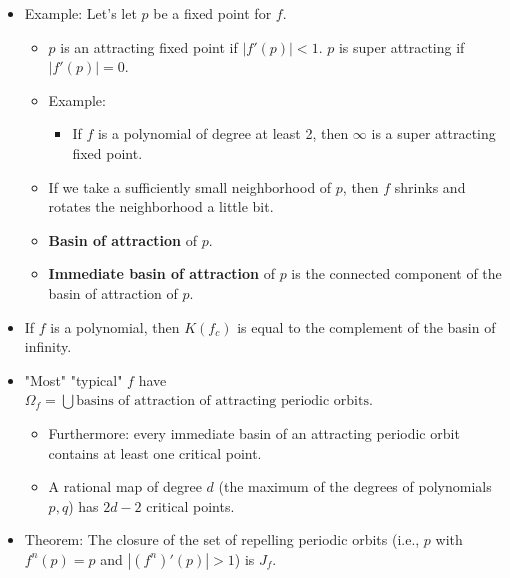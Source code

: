 \documentclass[../main.tex]{subfiles}
\begin{document}
\begin{itemize}
    \item Example: Let's let $p$ be a fixed point for $f$.
    \begin{itemize}
        \item $p$ is an attracting fixed point if $|f'(p)|<1$. $p$ is super attracting if $|f'(p)|=0$.
        \item Example:
        \begin{itemize}
            \item If $f$ is a polynomial of degree at least 2, then $\infty$ is a super attracting fixed point.
        \end{itemize}
        \item If we take a sufficiently small neighborhood of $p$, then $f$ shrinks and rotates the neighborhood a little bit.
        \item \textbf{Basin of attraction} of $p$.
        \item \textbf{Immediate basin of attraction} of $p$ is the connected component of the basin of attraction of $p$.
    \end{itemize}
    \item If $f$ is a polynomial, then $K(f_c)$ is equal to the complement of the basin of infinity.
    \item "Most" "typical" $f$ have $\Omega_f=\bigcup\text{basins of attraction of attracting periodic orbits}$.
    \begin{itemize}
        \item Furthermore: every immediate basin of an attracting periodic orbit contains at least one critical point.
        \item A rational map of degree $d$ (the maximum of the degrees of polynomials $p,q$) has $2d-2$ critical points.
    \end{itemize}
    \item Theorem: The closure of the set of repelling periodic orbits (i.e., $p$ with $f^n(p)=p$ and $|(f^n)'(p)|>1$) is $J_f$.
\end{itemize}
\end{document}
